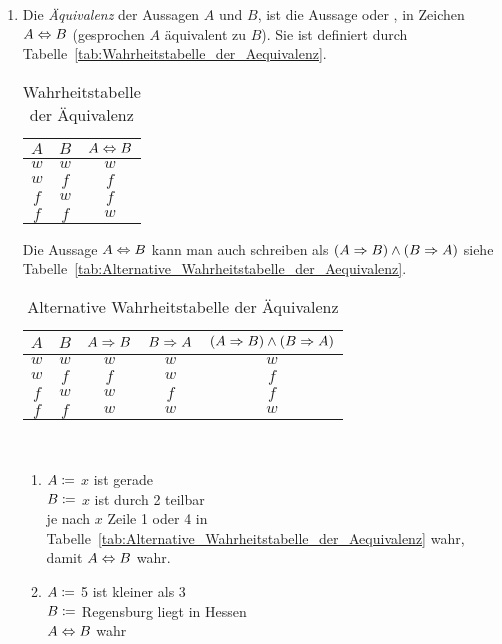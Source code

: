 \begin{definition}
\begin{enumerate}
\item Die \emph{Äquivalenz} der Aussagen $A$ und $B$, ist die Aussage  oder , in Zeichen $A \Leftrightarrow B$ (gesprochen $A$ äquivalent zu $B$). Sie ist definiert durch Tabelle~\vref{tab:Wahrheitstabelle_der_Aequivalenz}.
	\begin{table}[htb]
	\center
	\begin{tabular}{c|c||c}
	$A$ & $B$ & $A \Leftrightarrow B$\\\hline
	$w$ & $w$ & $w$\\
	$w$ & $f$ & $f$\\
	$f$ & $w$ & $f$\\
	$f$ & $f$ & $w$\\
	\end{tabular}
	\caption{Wahrheitstabelle der Äquivalenz}
	\label{tab:Wahrheitstabelle_der_Aequivalenz}
	\end{table}
	Die Aussage $A \Leftrightarrow B$ kann man auch schreiben als $\left(A \Rightarrow B\right) \wedge \left(B \Rightarrow A\right)$ siehe Tabelle~\vref{tab:Alternative_Wahrheitstabelle_der_Aequivalenz}.
	\begin{table}[htb]
	\center
	\begin{tabular}{c|c||c|c|c}
	$A$ & $B$ & $A \Rightarrow B$ & $B \Rightarrow A$ & $\left(A \Rightarrow B\right) \wedge \left(B \Rightarrow A\right)$\\\hline
	$w$ & $w$ & $w$ & $w$ & $w$\\
	$w$ & $f$ & $f$ & $w$ & $f$\\
	$f$ & $w$ & $w$ & $f$ & $f$\\
	$f$ & $f$ & $w$ & $w$ & $w$\\
	\end{tabular}
	\caption{Alternative Wahrheitstabelle der Äquivalenz}
	\label{tab:Alternative_Wahrheitstabelle_der_Aequivalenz}
	\end{table}

	\begin{example}~
	\begin{enumerate}
	\item $A \mathrel{\mathop:\!\!=}$ $x$ ist gerade\\$B \mathrel{\mathop:\!\!=}$ $x$ ist durch 2 teilbar\\je nach $x$ Zeile 1 oder 4 in Tabelle~\vref{tab:Alternative_Wahrheitstabelle_der_Aequivalenz} wahr, damit $A \Leftrightarrow B$ wahr. 
	\item $A \mathrel{\mathop:\!\!=}$ 5 ist kleiner als 3\\$B \mathrel{\mathop:\!\!=}$ Regensburg liegt in Hessen\\$A \Leftrightarrow B$ wahr
	\end{enumerate}
	\end{example}
\end{enumerate}
\end{definition}

